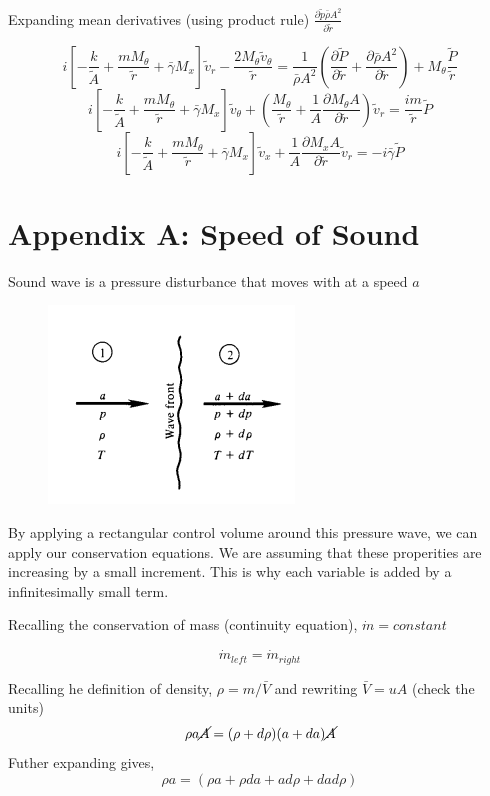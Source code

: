 \documentclass[12pt]{article}
\begin{document}
Expanding mean derivatives (using product rule) $\frac{\partial \tilde{p}\bar{\rho} A^2}{\partial \tilde{r}} $

\[ i\left[ - \frac{k}{\tilde{A}} + \frac{m M_{\theta}}{\tilde{r}} + \bar{\gamma} M_x \right] \tilde{v}_r - \frac{2 M_{\theta} \tilde{v}_{\theta}}{\tilde{r}} = \frac{1}{\bar{\rho} A^2}\left( \frac{\partial \tilde{P}}{\partial \tilde{r}} + \frac{\partial \bar{\rho} A^2}{\partial \tilde{r}}  \right)+ M_{\theta}\frac{\tilde{P}}{\tilde{r}}\]
\[i\left[ - \frac{k}{\tilde{A}} + \frac{m M_{\theta}}{\tilde{r}} + \bar{\gamma} M_x \right] \tilde{v}_{\theta} + \left(\frac{ M_{\theta}}{\tilde{r}}  + \frac{1}{A} \frac{\partial M_{\theta}A}{\partial \tilde{r}}\right)\tilde{v}_r = \frac{i m}{\tilde{r}}\tilde{P}\]
\[i\left[ - \frac{k}{\tilde{A}} + \frac{m M_{\theta}}{\tilde{r}} + \bar{\gamma} M_x \right] \tilde{v}_x  + \frac{1}{A} \frac{\partial M_x A}{\partial \tilde{r}}\tilde{v}_r = -i \bar{\gamma}\tilde{P} \]
\section{Appendix A: Speed of Sound}




Sound wave is a pressure disturbance that moves with at a speed $a$

\begin{figure}[h!]
	\centering
	\includegraphics[width=0.3\linewidth]{screenshot001}
	\caption{}
	\label{fig:screenshot001}
\end{figure}

By applying a rectangular control volume around this pressure wave, we can apply our conservation equations. We are assuming that these properities are increasing by a small increment. This is why each variable is added by a infinitesimally small term.

Recalling the conservation of mass (continuity equation), $\dot{m} = constant$

\[\dot{m}_{left} = \dot{m}_{right}\]

Recalling he definition of density, $\rho = m/\bar{V}$ and rewriting $\bar{V} = uA$ (check the units)
\[\rho a \cancel{A}  = (\rho + d\rho)(a + da) \cancel{A}\]
Futher expanding gives,
\[\rho a   = (\rho a+ \rho da + a d\rho + da d\rho)\]
\end{document}
